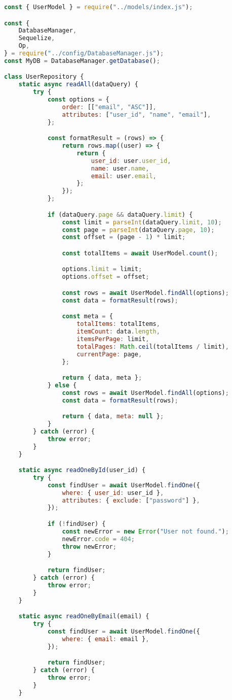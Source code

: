 \begin{lstlisting}[language=Javascript,caption={User Repository}]
const { UserModel } = require("../models/index.js");

const {
	DatabaseManager,
	Sequelize,
	Op,
} = require("../config/DatabaseManager.js");
const MyDB = DatabaseManager.getDatabase();

class UserRepository {
	static async readAll(dataQuery) {
		try {
			const options = {
				order: [["email", "ASC"]],
				attributes: ["user_id", "name", "email"],
			};

			const formatResult = (rows) => {
				return rows.map((user) => {
					return {
						user_id: user.user_id,
						name: user.name,
						email: user.email,
					};
				});
			};

			if (dataQuery.page && dataQuery.limit) {
				const limit = parseInt(dataQuery.limit, 10);
				const page = parseInt(dataQuery.page, 10);
				const offset = (page - 1) * limit;

				const totalItems = await UserModel.count();

				options.limit = limit;
				options.offset = offset;

				const rows = await UserModel.findAll(options);
				const data = formatResult(rows);

				const meta = {
					totalItems: totalItems,
					itemCount: data.length,
					itemsPerPage: limit,
					totalPages: Math.ceil(totalItems / limit),
					currentPage: page,
				};

				return { data, meta };
			} else {
				const rows = await UserModel.findAll(options);
				const data = formatResult(rows);

				return { data, meta: null };
			}
		} catch (error) {
			throw error;
		}
	}

	static async readOneById(user_id) {
		try {
			const findUser = await UserModel.findOne({
				where: { user_id: user_id },
				attributes: { exclude: ["password"] },
			});

			if (!findUser) {
				const newError = new Error("User not found.");
				newError.code = 404;
				throw newError;
			}

			return findUser;
		} catch (error) {
			throw error;
		}
	}

	static async readOneByEmail(email) {
		try {
			const findUser = await UserModel.findOne({
				where: { email: email },
			});

			return findUser;
		} catch (error) {
			throw error;
		}
	}


\end{lstlisting}
